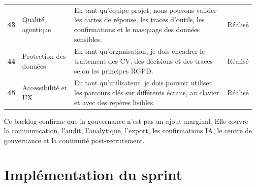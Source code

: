\begin{table}[H]
\begin{tabularx}{\textwidth}{>{\bfseries}p{1.3cm}p{3cm}X>{\raggedright\arraybackslash}p{2cm}}
    43 & Qualité agentique & En tant qu'équipe projet, nous pouvons valider les cartes de réponse, les traces d'outils, les confirmations et le masquage des données sensibles. & Réalisé \\
    44 & Protection des données & En tant qu'organisation, je dois encadrer le traitement des CV, des décisions et des traces selon les principes RGPD. & Réalisé \\
    45 & Accessibilité et UX & En tant qu'utilisateur, je dois pouvoir utiliser les parcours clés sur différents écrans, au clavier et avec des repères lisibles. & Réalisé \\
    \bottomrule
  \end{tabularx}
\end{table}

Ce backlog confirme que la gouvernance n'est pas un ajout marginal. Elle couvre la communication, l'audit, l'analytique, l'export, les confirmations IA, le centre de gouvernance et la continuité post-recrutement.

\section{Implémentation du sprint}

